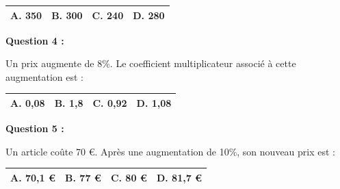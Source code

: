 \documentclass[12pt,a4paper]{article}
\begin{document}
\renewcommand{\arraystretch}{3}
\begin{tabular}{|m{3.4cm}|m{3.4cm}|m{3.4cm}|m{3.4cm}|}
\hline
\centering \vspace{-0.3cm} \textbf{A.} 350 & 
\centering \vspace{-0.3cm} \textbf{B.} 300 & 
\centering \vspace{-0.3cm} \textbf{C.} 240 & 
\centering \vspace{-0.3cm} \textbf{D.} 280 \tabularnewline
\hline
\end{tabular}

\vspace{0.7cm}

\textbf{Question 4 :}
\vspace{5pt}

Un prix augmente de 8\%. Le coefficient multiplicateur associé à cette augmentation est :
\vspace{0.3cm}

\renewcommand{\arraystretch}{3}
\begin{tabular}{|m{3.4cm}|m{3.4cm}|m{3.4cm}|m{3.4cm}|}
\hline
\centering \vspace{-0.3cm} \textbf{A.} 0,08 & 
\centering \vspace{-0.3cm} \textbf{B.} 1,8 & 
\centering \vspace{-0.3cm} \textbf{C.} 0,92 & 
\centering \vspace{-0.3cm} \textbf{D.} 1,08 \tabularnewline
\hline
\end{tabular}

\vspace{0.7cm}

\textbf{Question 5 :}
\vspace{5pt}

Un article coûte 70 €. Après une augmentation de 10\%, son nouveau prix est :
\vspace{0.3cm}

\renewcommand{\arraystretch}{3}
\begin{tabular}{|m{3.4cm}|m{3.4cm}|m{3.4cm}|m{3.4cm}|}
\hline
\centering \vspace{-0.3cm} \textbf{A.} 70,1 € & 
\centering \vspace{-0.3cm} \textbf{B.} 77 € & 
\centering \vspace{-0.3cm} \textbf{C.} 80 € & 
\centering \vspace{-0.3cm} \textbf{D.} 81,7 € \tabularnewline
\hline
\end{tabular}

\vspace{0.7cm}
\end{document}
